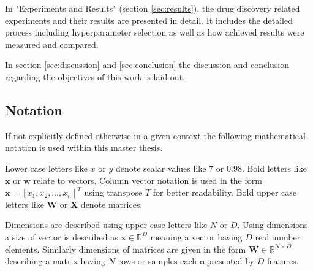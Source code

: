 \documentclass[../main.tex]{subfiles}
\begin{document}
In "Experiments and Results" (section \ref{sec:results}), the drug discovery related experiments and their results are presented in detail. It includes the detailed process including hyperparameter selection as well as how achieved results were measured and compared.

In section \ref{sec:discussion} and \ref{sec:conclusion} the discussion and conclusion regarding the objectives of this work is laid out.

\subsection{Notation}

If not explicitly defined otherwise in a given context the following mathematical notation is used within this master thesis.

Lower case letters like $x$ or $y$ denote scalar values like $7$ or $0.98$. Bold letters like $\mathbf{x}$ or $\mathbf{w}$ relate to vectors. Column vector notation is used in the form $\mathbf{x} = [x_1, x_2, \ldots, x_n]^T$ using transpose $T$ for better readability. Bold upper case letters like $\mathbf{W}$ or $\mathbf{X}$ denote matrices. 

Dimensions are described using upper case letters like $N$ or $D$. Using dimensions a size of vector is described as $\mathbf{x} \in \mathbb{R}^D$ meaning a vector having $D$ real number elements. Similarly dimensions of matrices are given in the form $\mathbf{W} \in \mathbb{R}^{N \times D}$ describing a matrix having $N$ rows or samples each represented by $D$ features.

\newpage
\end{document}
